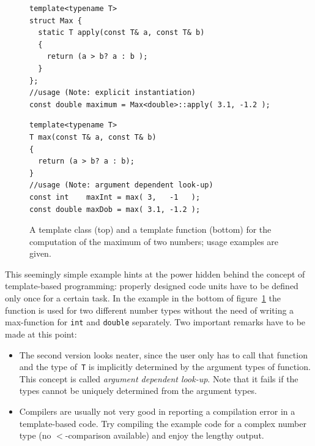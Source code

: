 \documentclass[a4paper,DIV=12,10pt]{scrartcl}
\begin{document}
\begin{figure}[htbp]
  \centering
  \begin{verbatim}
template<typename T> 
struct Max {
  static T apply(const T& a, const T& b)
  { 
    return (a > b? a : b );
  }
};
//usage (Note: explicit instantiation)
const double maximum = Max<double>::apply( 3.1, -1.2 );
  \end{verbatim} 
  \begin{verbatim}
template<typename T>
T max(const T& a, const T& b)
{
  return (a > b? a : b);
}
//usage (Note: argument dependent look-up)
const int    maxInt = max( 3,   -1   );
const double maxDob = max( 3.1, -1.2 );
  \end{verbatim}

  \caption{A template class (top) and a template function (bottom) for
  the computation of the maximum of two numbers; usage examples are given.}
  \label{fig:template}
\end{figure}

This seemingly simple example hints at the power hidden behind the
concept of template-based programming: properly designed code
units have to be defined only once for a certain task.  In the
example in the bottom of figure~\ref{fig:template} the function is
used for two different number types without the need of writing a
max-function for \texttt{int} and \texttt{double} separately.  Two
important remarks have to be made at this point:
\begin{itemize}
\item The second version looks neater, since the user only has to call
  that function and the type of~\texttt{T} is implicitly determined by
  the argument types of function. This concept is called
  \emph{argument dependent look-up}. Note that it fails if the types
  cannot be uniquely determined from the argument types.
\item Compilers are usually not very good in reporting a compilation
  error in a template-based code. Try compiling the example code for a
  complex number type (no $<$-comparison available) and enjoy the
  lengthy output.
\end{itemize}
\end{document}
